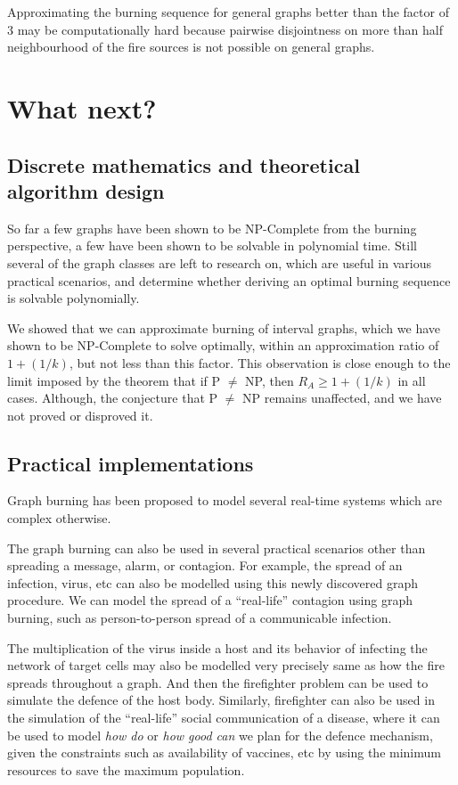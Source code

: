 Approximating the burning sequence for general graphs better than the factor of $3$ may be computationally hard because pairwise disjointness on more than half neighbourhood of the fire sources is not possible on general graphs.

\section{What next?}

\subsection{Discrete mathematics and theoretical algorithm design}

So far a few graphs have been shown to be NP-Complete from the burning perspective, a few have been shown to be solvable in polynomial time.
Still several of the graph classes are left to research on, which are useful in various practical scenarios, and determine whether deriving an optimal burning sequence is solvable polynomially.

We showed that we can approximate burning of interval graphs, which we have shown to be NP-Complete to solve optimally, within an approximation ratio of $1+(1/k)$, but not less than this factor.
This observation is close enough to the limit imposed by the theorem that if P $\neq$ NP, then $R_A\geq 1+(1/k)$ in all cases. Although, the conjecture that P $\neq$ NP remains unaffected, and we have not proved or disproved it.

\subsection{Practical implementations}

Graph burning has been proposed to model several real-time systems which are complex otherwise.

The graph burning can also be used in several practical scenarios other than spreading a message, alarm, or contagion. For example, the spread of an infection, virus, etc can also be modelled using this newly discovered graph procedure. We can model the spread of a ``real-life'' contagion using graph burning, such as person-to-person spread of a communicable infection.

The multiplication of the virus inside a host and its behavior of infecting the network of target cells may also be modelled very precisely same as how the fire spreads throughout a graph. And then the firefighter problem can be used to simulate the defence of the host body. Similarly, firefighter can also be used in the simulation of the ``real-life'' social communication of a disease, where it can be used to model \textit{how do} or \textit{how good can} we plan for the defence mechanism, given the constraints such as availability of vaccines, etc by using the minimum resources to save the maximum population.

